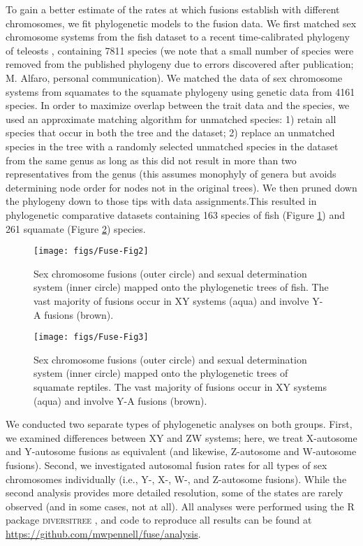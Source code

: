 To gain a better estimate of the rates at which fusions establish with different chromosomes, we fit phylogenetic models to the fusion data. We first matched sex chromosome systems from the fish dataset to a recent time-calibrated phylogeny of teleosts \citep{Rabosky2013}, containing 7811 species (we note that a small number of species were removed from the published phylogeny due to errors discovered after publication; M. Alfaro, personal communication). We matched the data of sex chromosome systems from squamates to the squamate phylogeny \citep{Pyron2013, PyronBurbrink2013} using genetic data from 4161 species. In order to maximize overlap between the trait data and the species, we used an approximate matching algorithm for unmatched species: 1) retain all species that occur in both the tree and the dataset; 2) replace an unmatched species in the tree with a randomly selected unmatched species in the dataset from the same genus as long as this did not result in more than two representatives from the genus (this assumes monophyly of genera but avoids determining node order for nodes not in the original trees). We then pruned down the phylogeny down to those tips with data assignments.This resulted in phylogenetic comparative datasets containing 163 species of fish (Figure \ref{fig:phylo-fish}) and 261 squamate (Figure \ref{fig:phylo-squa}) species.

\begin{figure}
\centering
\texttt{[image: figs/Fuse-Fig2]}
\caption[Phylogenetic distribution of sex chromosome fusions in fish]{Sex chromosome fusions (outer circle) and sexual determination system (inner circle) mapped onto the phylogenetic trees of fish. The vast majority of fusions occur in XY systems (aqua) and involve Y-A fusions (brown).}
\label{fig:phylo-fish}
\end{figure}

\begin{figure}
\centering
\texttt{[image: figs/Fuse-Fig3]}
\caption[Phylogenetic distribution of sex chromosome fusions in squamates]{Sex chromosome fusions (outer circle) and sexual determination system (inner circle) mapped onto the phylogenetic trees of squamate reptiles. The vast majority of fusions occur in XY systems (aqua) and involve Y-A fusions (brown).}
\label{fig:phylo-squa}
\end{figure}



We conducted two separate types of phylogenetic analyses on both groups. First, we examined differences between XY and ZW systems; here, we treat X-autosome and Y-autosome fusions as equivalent (and likewise, Z-autosome and W-autosome fusions). Second, we investigated autosomal fusion rates for all types of sex chromosomes individually (i.e., Y-, X-, W-, and Z-autosome fusions). While the second analysis provides more detailed resolution, some of the states are rarely observed (and in some cases, not at all). All analyses were performed using the R package \textsc{diversitree} \citep{FitzJohn2012}, and code to reproduce all results can be found at \url{https://github.com/mwpennell/fuse/analysis}. 

